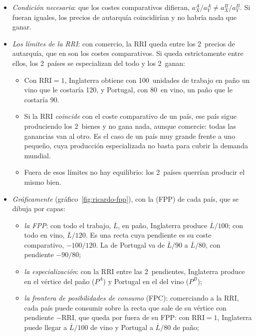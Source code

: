 \documentclass[11pt]{article}
\begin{document}
\begin{itemize}
\item \emph{Condición necesaria}: que los costes comparativos difieran, $a_X^A/a_Y^A\neq a_X^B/a_Y^B$. Si fueran iguales, los precios de autarquía coincidirían y no habría nada que ganar.
\item \emph{Los límites de la RRI}: con comercio, la RRI queda entre los 2~precios de autarquía, que en  son los costes comparativos. Si queda estrictamente entre ellos, los 2~países se especializan del todo y los 2~ganan:
  \begin{itemize}
  \item Con $\mathrm{RRI}=1$, Inglaterra obtiene con 100~unidades de trabajo en paño un vino que le costaría 120, y Portugal, con 80~en vino, un paño que le costaría 90.
  \item Si la RRI \emph{coincide} con el coste comparativo de un país, ese país sigue produciendo los 2~bienes y no gana nada, aunque comercie: todas las ganancias van al otro. Es el caso de un país muy grande frente a uno pequeño, cuya producción especializada no basta para cubrir la demanda mundial.
  \item Fuera de esos límites no hay equilibrio: los 2~países querrían producir el mismo bien.
  \end{itemize}
\item \emph{Gráficamente} (gráfico~\ref{fig:ricardo-fpp}), con la  (FPP) de cada país, que se dibuja por capas:
  \begin{itemize}
  \item \emph{la FPP}: con todo el trabajo, $\overline L$, en paño, Inglaterra produce $\overline L/100$; con todo en vino, $\overline L/120$. Es una recta cuya pendiente es su coste comparativo, $-100/120$. La de Portugal va de $\overline L/90$ a $\overline L/80$, con pendiente $-90/80$;
  \item \emph{la especialización}: con la RRI entre las 2~pendientes, Inglaterra produce en el vértice del paño ($P^A$) y Portugal en el del vino ($P^B$);
  \item \emph{la frontera de posibilidades de consumo} (FPC): comerciando a la RRI, cada país puede consumir sobre la recta que sale de su vértice con pendiente $-\mathrm{RRI}$, que queda por fuera de su FPP: con $\mathrm{RRI}=1$, Inglaterra puede llegar a $\overline L/100$ de vino y Portugal a $\overline L/80$ de paño;

\end{itemize}
\end{itemize}
\end{document}
